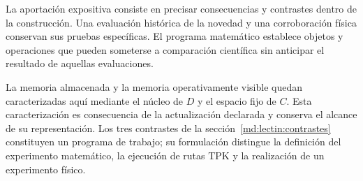 La aportación expositiva consiste en precisar consecuencias y
contrastes dentro de la construcción. Una evaluación histórica de
la novedad y una corroboración física conservan sus pruebas
específicas. El programa matemático establece objetos y operaciones
que pueden someterse a comparación científica sin anticipar el
resultado de aquellas evaluaciones.

La memoria almacenada y la memoria operativamente visible quedan
caracterizadas aquí mediante el núcleo de $D$ y el espacio fijo de
$C$. Esta caracterización es consecuencia de la actualización
declarada y conserva el alcance de su representación. Los tres
contrastes de la sección~\ref{md:lectin:contrastes} constituyen un
programa de trabajo; su formulación distingue la definición del
experimento matemático, la ejecución de rutas TPK y la realización
de un experimento físico.
